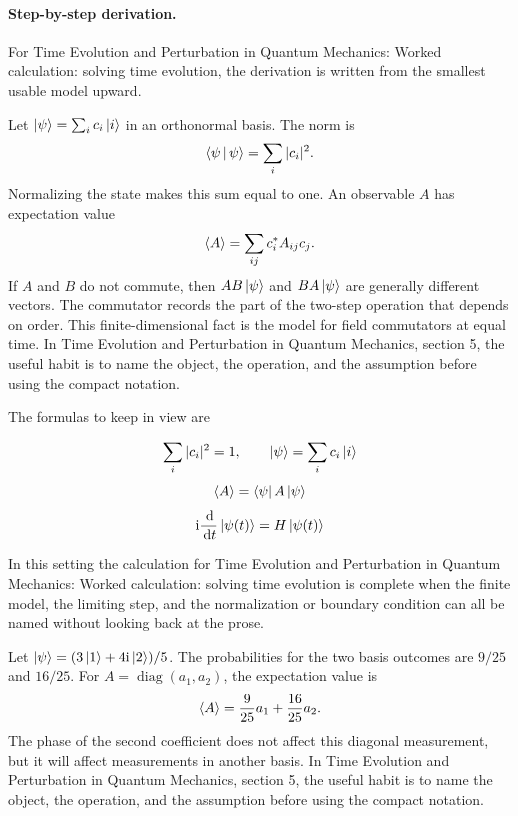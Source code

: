 \paragraph{Step-by-step derivation.}

For Time Evolution and Perturbation in Quantum Mechanics: Worked calculation: solving time evolution, the derivation is written from the smallest usable model upward.

Let \(\left|\psi\right\rangle=\sum_i c_i\left|i\right\rangle\) in an orthonormal basis.  The norm is
\[
  \left\langle \psi\,\middle|\,\psi\right\rangle=\sum_i |c_i|^2.
\]
Normalizing the state makes this sum equal to one.  An observable \(A\) has expectation value
\[
  \left\langle A\right\rangle=\sum_{ij}c_i^*A_{ij}c_j.
\]
If \(A\) and \(B\) do not commute, then \(AB\left|\psi\right\rangle\) and \(BA\left|\psi\right\rangle\) are generally different vectors.  The commutator records the part of the two-step operation that depends on order.  This finite-dimensional fact is the model for field commutators at equal time.  In Time Evolution and Perturbation in Quantum Mechanics, section 5, the useful habit is to name the object, the operation, and the assumption before using the compact notation.

The formulas to keep in view are

\[
  \sum_i |c_i|^2=1,\qquad \left|\psi\right\rangle=\sum_i c_i\left|i\right\rangle
\]
\[
  \left\langle A\right\rangle=\left\langle \psi\right|A\left|\psi\right\rangle
\]
\[
  \mathrm i\frac{\,\mathrm d}{\,\mathrm d t}\left|\psi(t)\right\rangle=H\left|\psi(t)\right\rangle
\]

In this setting the calculation for Time Evolution and Perturbation in Quantum Mechanics: Worked calculation: solving time evolution is complete when the finite model, the limiting step, and the normalization or boundary condition can all be named without looking back at the prose.




\begin{example}
Let \(\left|\psi\right\rangle=(3\left|1\right\rangle+4\mathrm i\left|2\right\rangle)/5\).  The probabilities for the two basis outcomes are \(9/25\) and \(16/25\).  For \(A=\operatorname{diag}(a_1,a_2)\), the expectation value is
\[
  \left\langle A\right\rangle=\frac{9}{25}a_1+\frac{16}{25}a_2.
\]
The phase of the second coefficient does not affect this diagonal measurement, but it will affect measurements in another basis.  In Time Evolution and Perturbation in Quantum Mechanics, section 5, the useful habit is to name the object, the operation, and the assumption before using the compact notation.
\end{example}



